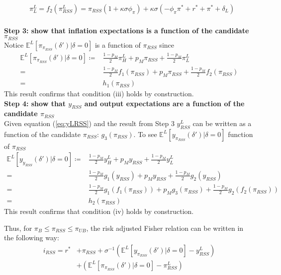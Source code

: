 \documentclass[11pt]{article}
\begin{document}
\begin{singlespace}
\begin{align}
		& \pi^{L}_{L} = f_2(\pi^{L}_{RSS}) = \pi_{RSS}(1+\kappa\sigma\phi_{\pi}) + \kappa\sigma(-\phi_{\pi}\pi^* + r^* + \pi^* + \delta_{L})
		\end{align}
		\\
		\noindent \textbf{Step 3: show that inflation expectations is a function of the candidate $\pi_{RSS}$}\\
		Notice $\mathbb{E}^{L}[\pi_{\pi_{RSS}}(\delta')|\delta=0]$ is a function of $\pi_{RSS}$ since 
		\begin{align*}
		\mathbb{E}^{L}[\pi_{\pi_{RSS}}(\delta')|\delta=0] \coloneqq& \frac{1-p_M}{2}\pi^{L}_H + p_{M}\pi_{RSS} + \frac{1-p_M}{2}\pi^{L}_L \\
		=& \frac{1-p_M}{2}f_1(\pi_{RSS}) + p_{M}\pi_{RSS} +  \frac{1-p_M}{2}f_2(\pi_{RSS}) \\
		=& h_1(\pi_{RSS})
		\end{align*}
		This result confirms that condition (iii) holds by construction. 		
		\\
		\noindent \textbf{Step 4: show that  $y_{RSS}$ and output expectations are a function of the candidate $\pi_{RSS}$}\\
		Given equation (\ref{eq:yLRSS}) and the result from Step 3 $y^{L}_{RSS}$ can be written as a function of the candidate $\pi_{RSS}$: $g_3(\pi_{RSS})$. To see $\mathbb{E}^{L}[y_{\pi_{RSS}}(\delta')|\delta=0]$ function of $\pi_{RSS}$ 
		\begin{align*}
		\mathbb{E}^{L}[y_{y_{RSS}}(\delta')|\delta=0] \coloneqq& \frac{1-p_M}{2}y^{L}_H + p_{M}y_{RSS} + \frac{1-p_M}{2}y^{L}_L \\
		=& \frac{1-p_M}{2}g_1(y_{RSS}) + p_{M}y_{RSS} +  \frac{1-p_M}{2}g_2(y_{RSS}) \\
		=& \frac{1-p_M}{2}g_1(f_1(\pi_{RSS})) + p_{M}g_3(\pi_{RSS}) +  \frac{1-p_M}{2}g_2(f_2(\pi_{RSS})) \\
		=& h_2(\pi_{RSS})
		\end{align*}
		This result confirms that condition (iv) holds by construction. 
		
		Thus, for $\pi_{B} \le \pi_{RSS} \le \pi_{UB}$, the risk adjusted Fisher relation can be written in the following way:
		\begin{align}
		i_{RSS} = r^* &+ \pi_{RSS} + \sigma^{-1}\left(\mathbb{E}^{L}[y_{\pi_{RSS}}(\delta')|\delta=0] - y_{RSS}^{L}\right) \nonumber \\
		&+ \left(\mathbb{E}^{L}[\pi_{\pi_{RSS}}(\delta')|\delta=0] - \pi_{RSS}^{L}\right)
		\end{align}
		

\end{singlespace}
\end{document}
